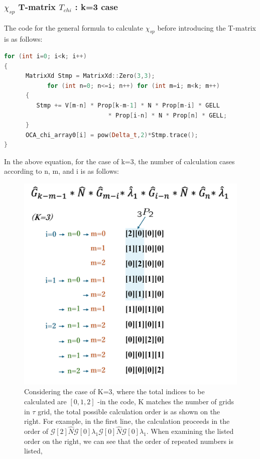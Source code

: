\documentclass{article}[12pt]
\numberwithin{equation}{section}
\begin{document}
\begin{spacing}{1.5}
\subsubsection*{$\chi_{sp}$ T-matrix $\hat{T}_{chi}$ : k=3 case}
The code for the general formula to calculate  $\chi_{sp}$ before introducing the T-matrix is as follows:
\begin{lstlisting}[language=C++, caption=Full One-crossing Approximation implementation code]
for (int i=0; i<k; i++)
{
	  MatrixXd Stmp = MatrixXd::Zero(3,3);
			for (int n=0; n<=i; n++) for (int m=i; m<k; m++)
      {
         Stmp += V[m-n] * Prop[k-m-1] * N * Prop[m-i] * GELL 
					         * Prop[i-n] * N * Prop[n] * GELL;
      }
      OCA_chi_array0[i] = pow(Delta_t,2)*Stmp.trace();
}
\end{lstlisting}
In the above equation, for the case of k=3, the number of calculation cases according to n, m, and i is as follows:
\begin{figure}[htbp]
  \centerline{\includegraphics[width=12cm]{TexFigure/Tmat.png}}
  \caption{Considering the case of K=3, where the total indices to be calculated are $[0, 1, 2]$ 
  -in the code, K matches the number of grids in $\tau$ grid, the total possible calculation order is as shown on the right. 
  For example, in the first line, the calculation proceeds in the order of $\mathcal{G}[2]\hat{N}\mathcal{G}[0]\lambda_1\mathcal{G}[0]\hat{N}\mathcal{G}[0]\lambda_1$. 
  When examining the listed order on the right, we can see that the order of repeated numbers is listed, 
}
\end{figure}
\end{spacing}
\end{document}
